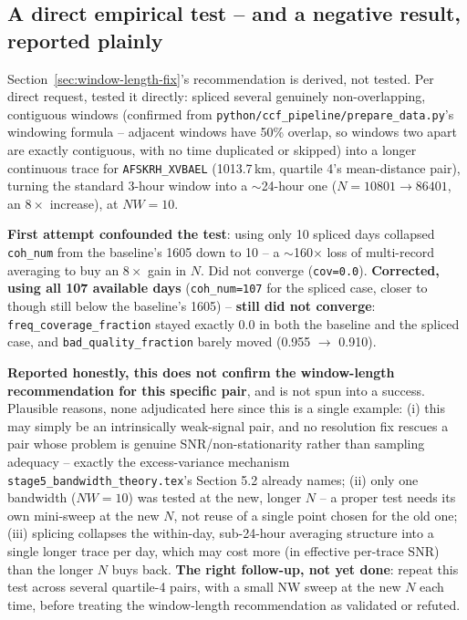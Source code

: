 \documentclass[11pt]{article}
\begin{document}
\subsection{A direct empirical test -- and a negative result, reported plainly}
\label{sec:splice-test}

Section~\ref{sec:window-length-fix}'s recommendation is derived, not tested. Per direct request,
tested it directly: spliced several genuinely non-overlapping, contiguous windows (confirmed from
\texttt{python/ccf\_pipeline/prepare\_data.py}'s windowing formula -- adjacent windows have 50\%
overlap, so windows two apart are exactly contiguous, with no time duplicated or skipped) into a
longer continuous trace for \texttt{AFSKRH\_XVBAEL} (1013.7\,km, quartile 4's mean-distance pair),
turning the standard 3-hour window into a $\sim$24-hour one ($N=10801\to86401$, an $8\times$
increase), at $NW=10$.

\textbf{First attempt confounded the test}: using only 10 spliced days collapsed \texttt{coh\_num}
from the baseline's 1605 down to 10 -- a $\sim$160$\times$ loss of multi-record averaging to buy
an $8\times$ gain in $N$. Did not converge (\texttt{cov=0.0}). \textbf{Corrected, using all 107
available days} (\texttt{coh\_num=107} for the spliced case, closer to though still below the
baseline's 1605) -- \textbf{still did not converge}: \texttt{freq\_coverage\_fraction} stayed
exactly 0.0 in both the baseline and the spliced case, and \texttt{bad\_quality\_fraction} barely
moved (0.955 $\to$ 0.910).

\textbf{Reported honestly, this does not confirm the window-length recommendation for this
specific pair}, and is not spun into a success. Plausible reasons, none adjudicated here since
this is a single example: (i) this may simply be an intrinsically weak-signal pair, and no
resolution fix rescues a pair whose problem is genuine SNR/non-stationarity rather than sampling
adequacy -- exactly the excess-variance mechanism \texttt{stage5\_bandwidth\_theory.tex}'s Section
5.2 already names; (ii) only one bandwidth ($NW=10$) was tested at the new, longer $N$ -- a
proper test needs its own mini-sweep at the new $N$, not reuse of a single point chosen for the
old one; (iii) splicing collapses the within-day, sub-24-hour averaging structure into a single
longer trace per day, which may cost more (in effective per-trace SNR) than the longer $N$ buys
back. \textbf{The right follow-up, not yet done}: repeat this test across several quartile-4
pairs, with a small NW sweep at the new $N$ each time, before treating the window-length
recommendation as validated or refuted.
\end{document}
